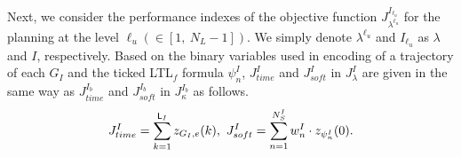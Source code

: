 \documentclass{article}
\newcommand{\Len}{{\sf L}}
\newcommand{\G}[1]{\Box_{[#1]}}
\newcommand{\Iu}{I_{\ell_u}}
\newcommand{\red}[1]{\textcolor{red}{#1}}
\begin{document}
Next, we consider the performance indexes of the objective function $J_{\lambda^{\ell_u}}^{\Iu}$ for the planning at the level $\ell_u(\in[1,~N_L-1])$.
We simply denote $\lambda^{\ell_u}$ and ${\Iu}$ as $\lambda$ and $I$, respectively.
Based on the binary variables used in encoding of a trajectory of each $G_{I}$ and the ticked LTL${}_f$ formula $\psi^{I}_n$, $J_{time}^I$ and $J_{soft}^I$ in $J_{\lambda}^I$ are given in the same way as $J_{time}^{I_b}$ and $J_{soft}^{I_b}$ in $J_{\kappa}^{I_b}$ as follows. 
\begin{align}\label{obj:2}
J_{time}^{I}=\sum_{k=1}^{\Len_{I}}z_{G_{I},e}(k),~ J_{soft}^{I}=\sum_{n=1}^{N_S^{I}} w_{n}^{I}\cdot z_{\psi_{n}^{I}}(0).
\end{align}
%
\begin{comment}
Then, we consider $J_{lower}^i$ that indicates the sum of rewards of completed bottom-level plans.
One of candidates $\pi_{i,j_i}(J_\kappa)$ for $\kappa\in K$ can be selected when $z_{p_{i,{j_i}}}(k)=1$ for $j_i\in[1,~M_i]$. 
To represent which plan is selected at the $k$-th state of the trajectory of $G_i$, we introduce $\Len_i + 1$ binary variables $y_{p_{i,{j_i}},\kappa}(k)\in\{0,~1\}$ for $k\in[0,~\Len_i]$, $i\in[1,~M]$, $j_i\in[1,~M_i]$, and $\kappa\in K$.
Only if $p_{i,{j_i}}$ is true at the $k$-th state, i.e., $z_{p_{i,{j_i}}}(k)=1$, $y_{p_{i,{j_i}},\kappa}(k)=1$ that  represents that the bottom-level plan of $G_{i,{j_i}}$ determined by $\pi_{i,j_i}(J_\kappa)$ is selected at the $k$-th state.
To represent when and which bottom-level plan is \red{put into action}, we introduce $\Len_i + 1$ binary variables ${y}^{i,j_i}_{\kappa}$ as follows.
\begin{align}
y^{i,j_i}_{\kappa}
=\G{0,m_{\pi_{i,j_i}(J_\kappa)}} y_{p_{i,j_i},\kappa}.\label{hier2-1}
\end{align}
For each $k\in[0,~\Len_i]$, ${y}^{i,j_i}_{\kappa}(k)=1$ represents that the bottom-level plan determined by $\pi_{i,j_i}(J_\kappa)$ is \red{put into action} from the $k$-th state of $\pi_i(J_\lambda)$ until $m_{\pi_{i,j_i}(J_\kappa)}$ is passed.
Since each bottom-level TDES represents detailed behavior of a task(system?), e.x., a detailed procedure of an operation, one of candidates have to be completed for every stay at the states where refined atomic propositions are assigned.
Then, $y_{p_{i,{j_i}},\kappa}(k)$ satisfy the following equations.
\begin{align}\label{hier1}
\sum_{\kappa\in K}{y}_{p_{i,{j_i}},\kappa}(k) = z_{p_{i,{j_i}}}(k),~\mbox{for }\forall k\in[0,~\Len_i].
\end{align}
%

\end{comment}
\end{document}
